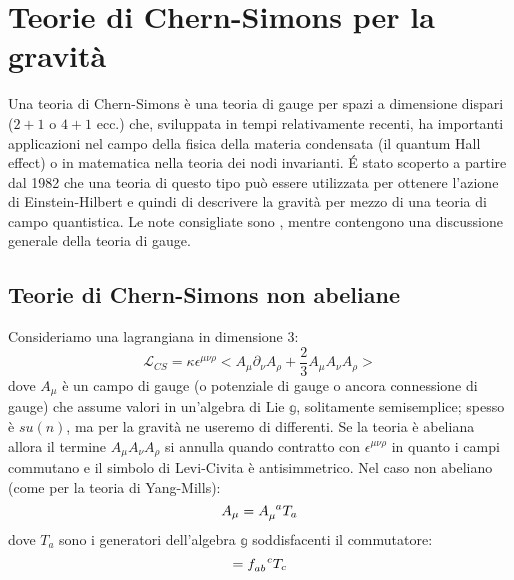 \chapter{Teorie di Chern-Simons per la gravità}\label{para.chern}
Una teoria di Chern-Simons è una teoria di gauge per spazi a dimensione dispari ($2+1$ o $4+1$ ecc.) che, sviluppata in tempi relativamente recenti, ha importanti applicazioni nel campo della fisica della materia condensata (il quantum Hall effect) o in matematica nella teoria dei nodi invarianti. \'E stato scoperto a partire dal 1982 che una teoria di questo tipo può essere utilizzata per ottenere l'azione di Einstein-Hilbert e quindi di descrivere la gravità per mezzo di una teoria di campo quantistica. Le note consigliate sono \cite{chernsimons}, mentre \cite{tong_gauge} contengono una discussione generale della teoria di gauge.
\section{Teorie di Chern-Simons non abeliane}
Consideriamo una lagrangiana in dimensione 3:
\begin{equation}
    \mathcal{L}_{CS} = \kappa \epsilon^{\mu\nu\rho} < A_\mu \partial_\nu A_\rho + \frac{2}{3}A_\mu A_\nu A_\rho>
    \label{eq.lagrangiana_cs}
\end{equation}
dove $A_\mu$ è un campo di gauge (o potenziale di gauge o ancora connessione di gauge) che assume valori in un'algebra di Lie $\mathbb{g}$, solitamente semisemplice; spesso è $su(n)$, ma per la gravità ne useremo di differenti. Se la teoria è abeliana allora il termine $A_\mu A_\nu A_\rho$ si annulla quando contratto con $\epsilon^{\mu\nu\rho}$ in quanto i campi commutano e il simbolo di Levi-Civita è antisimmetrico. Nel caso non abeliano (come per la teoria di Yang-Mills):
\begin{equation}
    A_\mu = \tensor{A}{_\mu^a}T_a
    \label{eq.campo_gauge_rispetto_generatore}
\end{equation}
dove $T_a$ sono i generatori dell'algebra $\mathbb g$ soddisfacenti il commutatore:
\begin{equation}
    [T_a, T_b] = \tensor{f}{_{ab}^c}T_c
    \label{eq.commutatore_alg_lie}
\end{equation}

